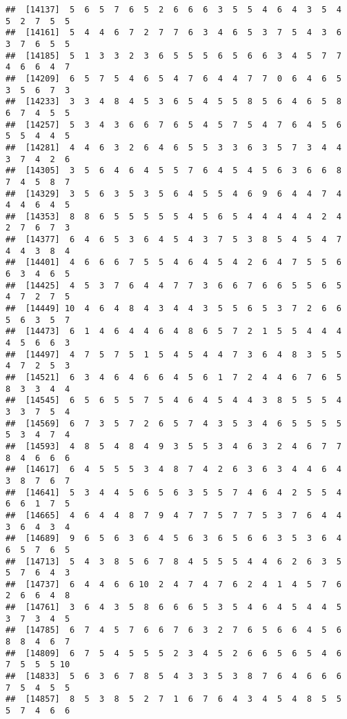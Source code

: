 \documentclass[
]{book}
\begin{document}
\begin{verbatim}
##  [14137]  5  6  5  7  6  5  2  6  6  6  3  5  5  4  6  4  3  5  4  5  2  7  5  5
##  [14161]  5  4  4  6  7  2  7  7  6  3  4  6  5  3  7  5  4  3  6  3  7  6  5  5
##  [14185]  5  1  3  3  2  3  6  5  5  5  6  5  6  6  3  4  5  7  7  4  6  6  4  7
##  [14209]  6  5  7  5  4  6  5  4  7  6  4  4  7  7  0  6  4  6  5  3  5  6  7  3
##  [14233]  3  3  4  8  4  5  3  6  5  4  5  5  8  5  6  4  6  5  8  6  7  4  5  5
##  [14257]  5  3  4  3  6  6  7  6  5  4  5  7  5  4  7  6  4  5  6  5  5  4  4  5
##  [14281]  4  4  6  3  2  6  4  6  5  5  3  3  6  3  5  7  3  4  4  3  7  4  2  6
##  [14305]  3  5  6  4  6  4  5  5  7  6  4  5  4  5  6  3  6  6  8  7  4  5  8  7
##  [14329]  3  5  6  3  5  3  5  6  4  5  5  4  6  9  6  4  4  7  4  4  4  6  4  5
##  [14353]  8  8  6  5  5  5  5  5  4  5  6  5  4  4  4  4  4  2  4  2  7  6  7  3
##  [14377]  6  4  6  5  3  6  4  5  4  3  7  5  3  8  5  4  5  4  7  4  4  3  8  4
##  [14401]  4  6  6  6  7  5  5  4  6  4  5  4  2  6  4  7  5  5  6  6  3  4  6  5
##  [14425]  4  5  3  7  6  4  4  7  7  3  6  6  7  6  6  5  5  6  5  4  7  2  7  5
##  [14449] 10  4  6  4  8  4  3  4  4  3  5  5  6  5  3  7  2  6  6  5  6  3  5  7
##  [14473]  6  1  4  6  4  4  6  4  8  6  5  7  2  1  5  5  4  4  4  4  5  6  6  3
##  [14497]  4  7  5  7  5  1  5  4  5  4  4  7  3  6  4  8  3  5  5  4  7  2  5  3
##  [14521]  6  3  4  6  4  6  6  4  5  6  1  7  2  4  4  6  7  6  5  8  3  3  4  4
##  [14545]  6  5  6  5  5  7  5  4  6  4  5  4  4  3  8  5  5  5  4  3  3  7  5  4
##  [14569]  6  7  3  5  7  2  6  5  7  4  3  5  3  4  6  5  5  5  5  5  3  4  7  4
##  [14593]  4  8  5  4  8  4  9  3  5  5  3  4  6  3  2  4  6  7  7  8  4  6  6  6
##  [14617]  6  4  5  5  5  3  4  8  7  4  2  6  3  6  3  4  4  6  4  3  8  7  6  7
##  [14641]  5  3  4  4  5  6  5  6  3  5  5  7  4  6  4  2  5  5  4  6  6  1  7  5
##  [14665]  4  6  4  4  8  7  9  4  7  7  5  7  7  5  3  7  6  4  4  3  6  4  3  4
##  [14689]  9  6  5  6  3  6  4  5  6  3  6  5  6  6  3  5  3  6  4  6  5  7  6  5
##  [14713]  5  4  3  8  5  6  7  8  4  5  5  5  4  4  6  2  6  3  5  5  7  6  4  3
##  [14737]  6  4  4  6  6 10  2  4  7  4  7  6  2  4  1  4  5  7  6  2  6  6  4  8
##  [14761]  3  6  4  3  5  8  6  6  6  5  3  5  4  6  4  5  4  4  5  3  7  3  4  5
##  [14785]  6  7  4  5  7  6  6  7  6  3  2  7  6  5  6  6  4  5  6  8  8  4  6  7
##  [14809]  6  7  5  4  5  5  5  2  3  4  5  2  6  6  5  6  5  4  6  7  5  5  5 10
##  [14833]  5  6  3  6  7  8  5  4  3  3  5  3  8  7  6  4  6  6  6  7  5  4  5  5
##  [14857]  8  5  3  8  5  2  7  1  6  7  6  4  3  4  5  4  8  5  5  5  7  4  6  6

\end{verbatim}
\end{document}
